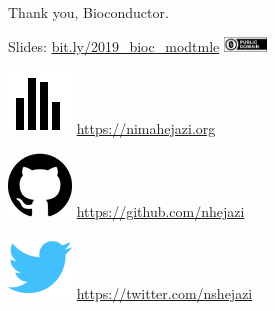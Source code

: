 \documentclass{beamer}
\begin{document}
\begin{frame}[c,allowframebreaks]{}

\small



\end{frame}


\begin{frame}[c]{Thank you, Bioconductor.}

\large
Slides: \href{https://bit.ly/2019\_bioc\_modtmle}{bit.ly/2019\_bioc\_modtmle}
  \quad
\includegraphics[height=4mm]{Figs/cc-zero.png}

\vspace{2mm}
\includegraphics[scale=0.14]{homepage.png} \url{https://nimahejazi.org}

\vspace{2mm}
\includegraphics[scale=0.11]{github-icon.png}
  \url{https://github.com/nhejazi}

\vspace{2mm}
\includegraphics[scale=0.14]{twitter-icon.png}
  \url{https://twitter.com/nshejazi}


\end{frame}
\end{document}
